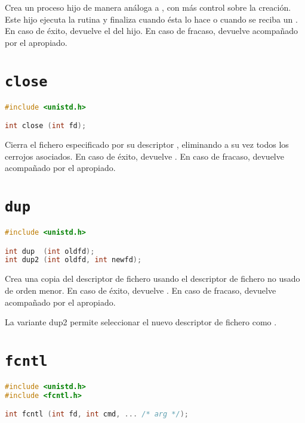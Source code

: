 Crea un proceso hijo de manera análoga a , con más control sobre la creación.
Este hijo ejecuta la rutina  y finaliza cuando ésta lo hace o cuando se reciba un .
En caso de éxito, devuelve el  del hijo.
En caso de fracaso, devuelve  acompañado por el  apropiado.

\pagebreak

\section{\texttt{close}}\label{close}

\begin{lstlisting}[language=C]
#include <unistd.h>

int close (int fd);
\end{lstlisting}

Cierra el fichero especificado por su descriptor , eliminando a su vez todos los cerrojos asociados.
En caso de éxito, devuelve .
En caso de fracaso, devuelve  acompañado por el  apropiado.

\section{\texttt{dup}}\label{dup}

\begin{lstlisting}[language=C]
#include <unistd.h>

int dup  (int oldfd);
int dup2 (int oldfd, int newfd);
\end{lstlisting}

Crea una copia del descriptor de fichero  usando el descriptor de fichero no usado de orden menor.
En caso de éxito, devuelve .
En caso de fracaso, devuelve  acompañado por el  apropiado.

La variante dup2 permite seleccionar el nuevo descriptor de fichero como .

\section{\texttt{fcntl}}\label{fcntl}

\begin{lstlisting}[language=C]
#include <unistd.h>
#include <fcntl.h>

int fcntl (int fd, int cmd, ... /* arg */);
\end{lstlisting}

